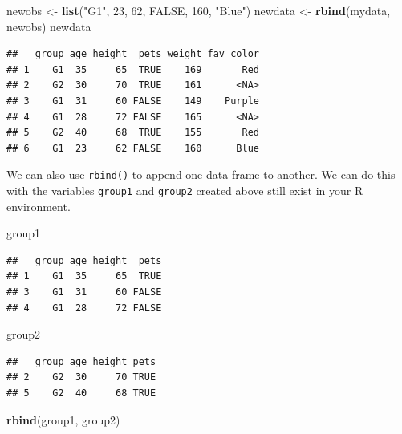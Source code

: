 \documentclass[
]{book}
\newenvironment{Shaded}{\begin{snugshade}}{\end{snugshade}}
\newcommand{\DecValTok}[1]{\textcolor[rgb]{0.00,0.00,0.81}{#1}}
\newcommand{\KeywordTok}[1]{\textcolor[rgb]{0.13,0.29,0.53}{\textbf{#1}}}
\newcommand{\NormalTok}[1]{#1}
\newcommand{\OtherTok}[1]{\textcolor[rgb]{0.56,0.35,0.01}{#1}}
\newcommand{\StringTok}[1]{\textcolor[rgb]{0.31,0.60,0.02}{#1}}
\begin{document}
\begin{Shaded}
\begin{Highlighting}[]
\NormalTok{newobs <-}\StringTok{ }\KeywordTok{list}\NormalTok{(}\StringTok{"G1"}\NormalTok{,}
    \DecValTok{23}\NormalTok{, }\DecValTok{62}\NormalTok{, }\OtherTok{FALSE}\NormalTok{, }\DecValTok{160}\NormalTok{,}
    \StringTok{"Blue"}\NormalTok{)}
\NormalTok{newdata <-}\StringTok{ }\KeywordTok{rbind}\NormalTok{(mydata,}
\NormalTok{    newobs)}
\NormalTok{newdata}
\end{Highlighting}
\end{Shaded}

\begin{verbatim}
##   group age height  pets weight fav_color
## 1    G1  35     65  TRUE    169       Red
## 2    G2  30     70  TRUE    161      <NA>
## 3    G1  31     60 FALSE    149    Purple
## 4    G1  28     72 FALSE    165      <NA>
## 5    G2  40     68  TRUE    155       Red
## 6    G1  23     62 FALSE    160      Blue
\end{verbatim}

We can also use \texttt{rbind()} to append one data frame to another. We can do this with the variables \texttt{group1} and \texttt{group2} created above still exist in your R environment.

\begin{Shaded}
\begin{Highlighting}[]
\NormalTok{group1}
\end{Highlighting}
\end{Shaded}

\begin{verbatim}
##   group age height  pets
## 1    G1  35     65  TRUE
## 3    G1  31     60 FALSE
## 4    G1  28     72 FALSE
\end{verbatim}

\begin{Shaded}
\begin{Highlighting}[]
\NormalTok{group2}
\end{Highlighting}
\end{Shaded}

\begin{verbatim}
##   group age height pets
## 2    G2  30     70 TRUE
## 5    G2  40     68 TRUE
\end{verbatim}

\begin{Shaded}
\begin{Highlighting}[]
\KeywordTok{rbind}\NormalTok{(group1, group2)}
\end{Highlighting}
\end{Shaded}
\end{document}

